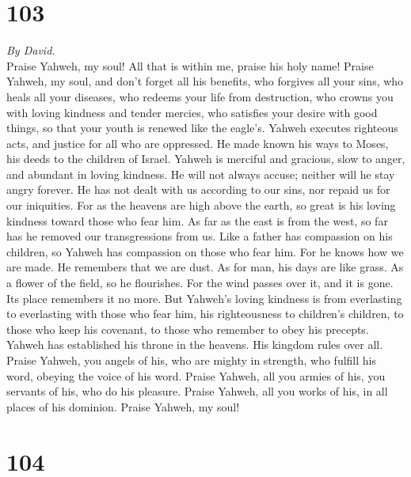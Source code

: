 \hypertarget{section-102}{%
\section{103}\label{section-102}}

\emph{By David.}\\
 Praise Yahweh, my soul! All that is within me, praise his
holy name!  Praise Yahweh, my soul, and don't forget all
his benefits,  who forgives all your sins, who heals all
your diseases,  who redeems your life from destruction,
who crowns you with loving kindness and tender mercies, 
who satisfies your desire with good things, so that your youth is
renewed like the eagle's.  Yahweh executes righteous acts,
and justice for all who are oppressed.  He made known his
ways to Moses, his deeds to the children of Israel. 
Yahweh is merciful and gracious, slow to anger, and abundant in loving
kindness.  He will not always accuse; neither will he stay
angry forever.  He has not dealt with us according to our
sins, nor repaid us for our iniquities.  For as the
heavens are high above the earth, so great is his loving kindness toward
those who fear him.  As far as the east is from the west,
so far has he removed our transgressions from us.  Like a
father has compassion on his children, so Yahweh has compassion on those
who fear him.  For he knows how we are made. He remembers
that we are dust.  As for man, his days are like grass.
As a flower of the field, so he flourishes.  For the wind
passes over it, and it is gone. Its place remembers it no more.
 But Yahweh's loving kindness is from everlasting to
everlasting with those who fear him, his righteousness to children's
children,  to those who keep his covenant, to those who
remember to obey his precepts.  Yahweh has established
his throne in the heavens. His kingdom rules over all. 
Praise Yahweh, you angels of his, who are mighty in strength, who
fulfill his word, obeying the voice of his word.  Praise
Yahweh, all you armies of his, you servants of his, who do his pleasure.
 Praise Yahweh, all you works of his, in all places of
his dominion. Praise Yahweh, my soul!

\hypertarget{section-103}{%
\section{104}\label{section-103}}

